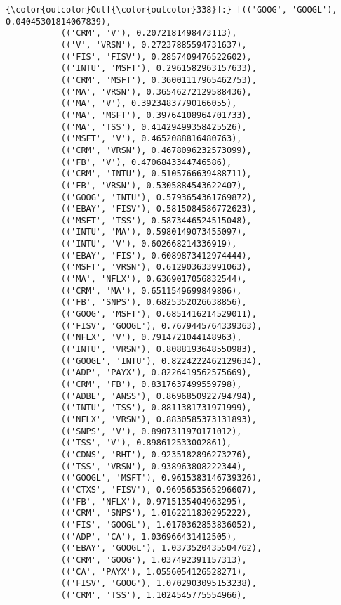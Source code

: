 \documentclass[11pt]{article}
\begin{document}
\begin{Verbatim}[commandchars=\\\{\}]
{\color{outcolor}Out[{\color{outcolor}338}]:} [(('GOOG', 'GOOGL'), 0.04045301814067839),
           (('CRM', 'V'), 0.2072181498473113),
           (('V', 'VRSN'), 0.27237885594731637),
           (('FIS', 'FISV'), 0.2857409476522602),
           (('INTU', 'MSFT'), 0.2961582963157633),
           (('CRM', 'MSFT'), 0.36001117965462753),
           (('MA', 'VRSN'), 0.36546272129588436),
           (('MA', 'V'), 0.39234837790166055),
           (('MA', 'MSFT'), 0.39764108964701733),
           (('MA', 'TSS'), 0.41429499358425526),
           (('MSFT', 'V'), 0.4652088816480763),
           (('CRM', 'VRSN'), 0.4678096232573099),
           (('FB', 'V'), 0.4706843344746586),
           (('CRM', 'INTU'), 0.5105766639488711),
           (('FB', 'VRSN'), 0.5305884543622407),
           (('GOOG', 'INTU'), 0.5793654361769872),
           (('EBAY', 'FISV'), 0.5815084586772623),
           (('MSFT', 'TSS'), 0.5873446524515048),
           (('INTU', 'MA'), 0.5980149073455097),
           (('INTU', 'V'), 0.602668214336919),
           (('EBAY', 'FIS'), 0.6089873412974444),
           (('MSFT', 'VRSN'), 0.612903633991063),
           (('MA', 'NFLX'), 0.6369017056832544),
           (('CRM', 'MA'), 0.6511549699849806),
           (('FB', 'SNPS'), 0.6825352026638856),
           (('GOOG', 'MSFT'), 0.6851416214529011),
           (('FISV', 'GOOGL'), 0.7679445764339363),
           (('NFLX', 'V'), 0.7914721044148963),
           (('INTU', 'VRSN'), 0.8088193648550983),
           (('GOOGL', 'INTU'), 0.8224222462129634),
           (('ADP', 'PAYX'), 0.8226419562575669),
           (('CRM', 'FB'), 0.8317637499559798),
           (('ADBE', 'ANSS'), 0.8696850922794794),
           (('INTU', 'TSS'), 0.8811381731971999),
           (('NFLX', 'VRSN'), 0.8830585373131893),
           (('SNPS', 'V'), 0.8907311970171012),
           (('TSS', 'V'), 0.898612533002861),
           (('CDNS', 'RHT'), 0.9235182896273276),
           (('TSS', 'VRSN'), 0.938963808222344),
           (('GOOGL', 'MSFT'), 0.9615383146739326),
           (('CTXS', 'FISV'), 0.9695653565296607),
           (('FB', 'NFLX'), 0.9715135404963295),
           (('CRM', 'SNPS'), 1.0162211830295222),
           (('FIS', 'GOOGL'), 1.0170362853836052),
           (('ADP', 'CA'), 1.036966431412505),
           (('EBAY', 'GOOGL'), 1.0373520435504762),
           (('CRM', 'GOOG'), 1.037492391157313),
           (('CA', 'PAYX'), 1.0556054126528271),
           (('FISV', 'GOOG'), 1.0702903095153238),
           (('CRM', 'TSS'), 1.1024545775554966),

\end{Verbatim}
\end{document}
